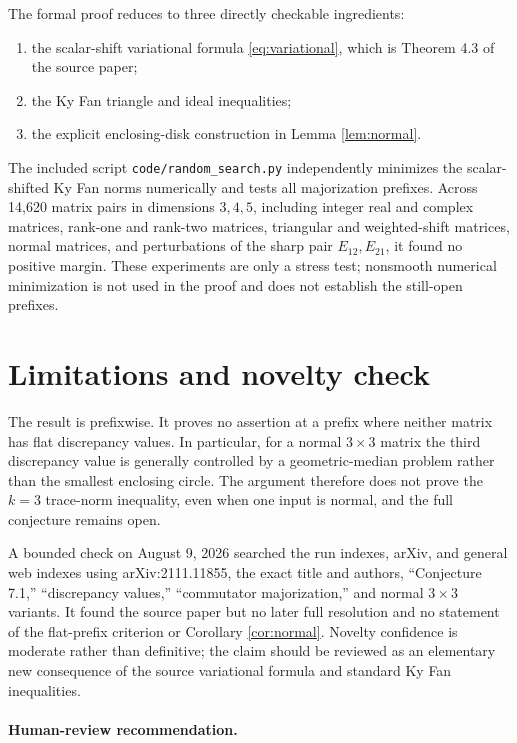 \documentclass[11pt]{article}
\begin{document}
The formal proof reduces to three directly checkable ingredients:

\begin{enumerate}
 \item the scalar-shift variational formula \eqref{eq:variational}, which is
       Theorem 4.3 of the source paper;
 \item the Ky Fan triangle and ideal inequalities;
 \item the explicit enclosing-disk construction in Lemma \ref{lem:normal}.
\end{enumerate}

The included script \texttt{code/random\_search.py} independently minimizes
the scalar-shifted Ky Fan norms numerically and tests all majorization
prefixes.  Across 14,620 matrix pairs in dimensions \(3,4,5\), including
integer real and complex matrices, rank-one and rank-two matrices, triangular
and weighted-shift matrices, normal matrices, and perturbations of the sharp
pair \(E_{12},E_{21}\), it found no positive margin.  These experiments are
only a stress test; nonsmooth numerical minimization is not used in the proof
and does not establish the still-open prefixes.

\section*{Limitations and novelty check}

The result is prefixwise.  It proves no assertion at a prefix where neither
matrix has flat discrepancy values.  In particular, for a normal
\(3\times3\) matrix the third discrepancy value is generally controlled by a
geometric-median problem rather than the smallest enclosing circle.  The
argument therefore does not prove the \(k=3\) trace-norm inequality, even when
one input is normal, and the full conjecture remains open.

A bounded check on August 9, 2026 searched the run indexes, arXiv, and general
web indexes using arXiv:2111.11855, the exact title and authors, “Conjecture
7.1,” “discrepancy values,” “commutator majorization,” and normal
\(3\times3\) variants.  It found the source paper but no later full resolution
and no statement of the flat-prefix criterion or Corollary
\ref{cor:normal}.  Novelty confidence is moderate rather than definitive;
the claim should be reviewed as an elementary new consequence of the source
variational formula and standard Ky Fan inequalities.

\enlargethispage{5\baselineskip}
\paragraph{Human-review recommendation.}
\end{document}
